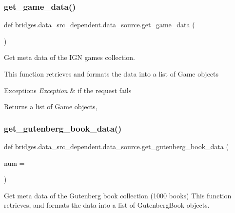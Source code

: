\subsubsection{\texorpdfstring{get\+\_\+game\+\_\+data()}{get\_game\_data()}}
{\footnotesize\ttfamily def bridges.\+data\+\_\+src\+\_\+dependent.\+data\+\_\+source.\+get\+\_\+game\+\_\+data (\begin{DoxyParamCaption}{ }\end{DoxyParamCaption})}



Get meta data of the I\+GN games collection. 

This function retrieves and formats the data into a list of Game objects


\begin{DoxyExceptions}{Exceptions}
{\em Exception} & if the request fails\\
\hline
\end{DoxyExceptions}
\begin{DoxyReturn}{Returns}
a list of Game objects, 
\end{DoxyReturn}
\mbox{\label{namespacebridges_1_1data__src__dependent_1_1data__source_af377da50c8f4e488b832978908274089}} 
\subsubsection{\texorpdfstring{get\+\_\+gutenberg\+\_\+book\+\_\+data()}{get\_gutenberg\_book\_data()}}
{\footnotesize\ttfamily def bridges.\+data\+\_\+src\+\_\+dependent.\+data\+\_\+source.\+get\+\_\+gutenberg\+\_\+book\+\_\+data (\begin{DoxyParamCaption}\item[{}]{num = {} }\end{DoxyParamCaption})}



Get meta data of the Gutenberg book collection (1000 books) This function retrieves, and formats the data into a list of Gutenberg\+Book objects. 


